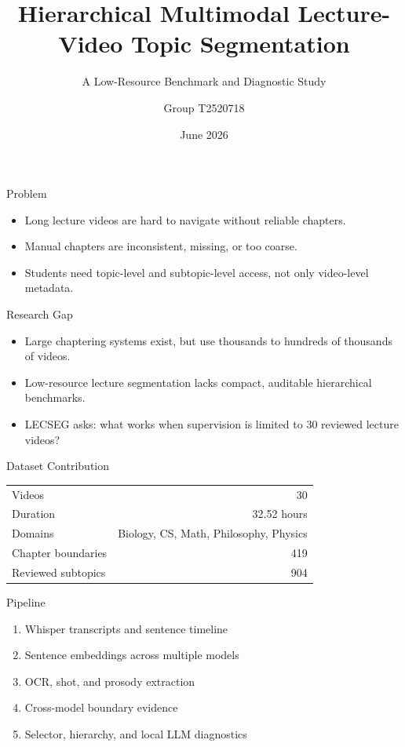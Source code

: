 \documentclass[aspectratio=169]{beamer}
\title[LECSEG]{Hierarchical Multimodal Lecture-Video Topic Segmentation}
\subtitle{A Low-Resource Benchmark and Diagnostic Study}
\author{Group T2520718}
\institute{Department of Computer Science and Engineering\\BRAC University}
\date{June 2026}
\begin{document}
\begin{frame}
  \titlepage
\end{frame}

\begin{frame}{Problem}
  \begin{itemize}
    \item Long lecture videos are hard to navigate without reliable chapters.
    \item Manual chapters are inconsistent, missing, or too coarse.
    \item Students need topic-level and subtopic-level access, not only video-level metadata.
  \end{itemize}
\end{frame}

\begin{frame}{Research Gap}
  \begin{itemize}
    \item Large chaptering systems exist, but use thousands to hundreds of thousands of videos.
    \item Low-resource lecture segmentation lacks compact, auditable hierarchical benchmarks.
    \item LECSEG asks: what works when supervision is limited to 30 reviewed lecture videos?
  \end{itemize}
\end{frame}

\begin{frame}{Dataset Contribution}
  \begin{table}
    \centering
    \begin{tabular}{lr}
      \toprule
      Videos & 30 \\
      Duration & 32.52 hours \\
      Domains & Biology, CS, Math, Philosophy, Physics \\
      Chapter boundaries & 419 \\
      Reviewed subtopics & 904 \\
      \bottomrule
    \end{tabular}
  \end{table}
\end{frame}

\begin{frame}{Pipeline}
  \begin{enumerate}
    \item Whisper transcripts and sentence timeline
    \item Sentence embeddings across multiple models
    \item OCR, shot, and prosody extraction
    \item Cross-model boundary evidence
    \item Selector, hierarchy, and local LLM diagnostics
  \end{enumerate}
\end{frame}
\end{document}
